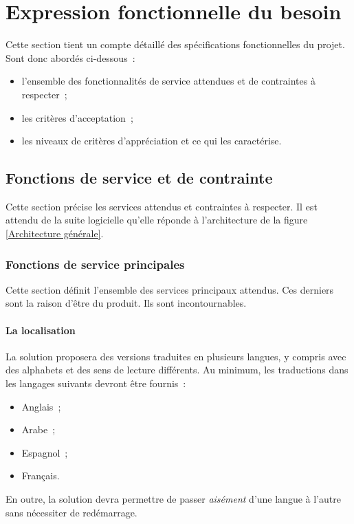 \chapter{Expression fonctionnelle du besoin}
Cette section tient un compte détaillé des spécifications fonctionnelles du projet. Sont donc abordés ci-dessous~:
\begin{itemize}
	\item l'ensemble des fonctionnalités de service attendues et de contraintes à respecter~;
	\item les critères d'acceptation~;
	\item les niveaux de critères d'appréciation et ce qui les caractérise.
\end{itemize}

\section{Fonctions de service et de contrainte}
Cette section précise les services attendus et contraintes à respecter.
Il est attendu de la suite logicielle qu'elle réponde à l'architecture de la figure \ref{Architecture générale}.

\subsection{Fonctions de service principales}
Cette section définit l'ensemble des services principaux attendus. Ces derniers sont la raison d'être du produit. Ils sont incontournables.

\subsubsection{La localisation}
La solution proposera des versions traduites en plusieurs langues, y compris avec des alphabets et des sens de lecture différents. Au minimum, les traductions dans les langages suivants devront être fournis~:
\begin{itemize}
	\item Anglais~;
	\item Arabe~;
	\item Espagnol~;
	\item Français.
\end{itemize}
En outre, la solution devra permettre de passer \emph{aisément} d'une langue à l'autre sans nécessiter de redémarrage.

